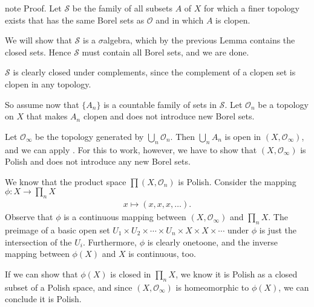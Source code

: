 \documentclass[letterpaper,10pt,english]{jupyterBook}
\begin{document}
\begin{sphinxadmonition}{note}
\sphinxAtStartPar
Proof. Let \(\mathcal{S}\) be the family of all subsets \(A\) of \(X\) for which a finer topology exists that has the same Borel sets as \(\mathcal{O}\) and in which \(A\) is clopen.

\sphinxAtStartPar
We will show that \(\mathcal{S}\) is a \(\sigma\)\sphinxhyphen{}algebra, which by the previous Lemma contains the closed sets. Hence \(\mathcal{S}\) must contain all Borel sets, and we are done.

\sphinxAtStartPar
\(\mathcal{S}\) is clearly closed under complements, since the complement of a clopen set is clopen in any topology.

\sphinxAtStartPar
So assume now that \(\{A_n\}\) is a countable family of sets in \(\mathcal{S}\). Let \(\mathcal{O}_n\) be a topology on \(X\) that makes \(A_n\) clopen and does not introduce new Borel sets.

\sphinxAtStartPar
Let \(\mathcal{O}_\infty\) be the topology generated by \(\bigcup_n \mathcal{O}_n\). Then \(\bigcup_n A_n\) is open in \((X, \mathcal{O}_\infty)\), and we can apply {\hyperref[\detokenize{subsets_Polish:lem-closed-clopen}]{}}. For this to work, however, we have to show that \((X, \mathcal{O}_\infty)\) is Polish and does not introduce any new Borel sets.

\sphinxAtStartPar
We know that the product space \(\prod (X,\mathcal{O}_n)\) is Polish. Consider the mapping \(\phi: X \to \prod_n X\)
\begin{equation*}
\begin{split}
    x \mapsto (x,x,x, \dots).
\end{split}
\end{equation*}
\sphinxAtStartPar
Observe that \(\phi\) is a continuous mapping between \((X,\mathcal{O}_{\infty})\) and \(\prod_n X\).  The preimage of a basic open set \(U_1 \times U_2 \times \cdots \times U_n \times X \times X \times \cdots\) under \(\phi\) is just the intersection of the \(U_i\). Furthermore, \(\phi\) is clearly one\sphinxhyphen{}to\sphinxhyphen{}one, and the inverse mapping between \(\phi(X)\) and \(X\) is continuous, too.

\sphinxAtStartPar
If we can show that \(\phi(X)\) is closed in \(\prod_n X\), we know it is Polish as a closed subset of a Polish space, and since \((X,\mathcal{O}_\infty)\) is homeomorphic to \(\phi(X)\), we can conclude it is Polish.


\end{sphinxadmonition}
\end{document}
